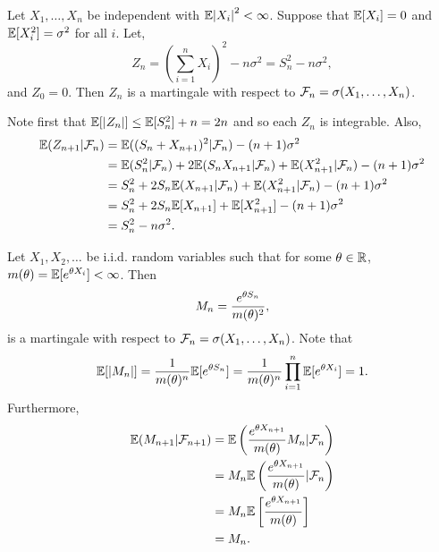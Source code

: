 \begin{example}
    Let $X_1,\ldots, X_n$ be independent with ${\mathbb{E}}{\left\lvert X_i\right\rvert}^2 < \infty$. Suppose that ${\mathbb{E}}[X_i]=0$ and ${\mathbb{E}}[X_i^2]=\sigma^2$ for all $i$. Let,
    \[Z_n = \left(\sum_{i=1}^n X_i\right)^2-n\sigma^2 = S_n^2-n\sigma^2,\]
    and $Z_0=0$. Then $Z_n$ is a martingale with respect to ${\mathcal{F}}_n = \sigma(X_1,\ldots, X_n)$.

    Note first that ${\mathbb{E}}[{\left\lvert Z_n\right\rvert}] \le {\mathbb{E}}[S_n^2]+n =2n$ and so each $Z_n$ is integrable. Also,
    \begin{align*}
        {\mathbb{E}}(Z_{n+1}|{\mathcal{F}}_n)&={\mathbb{E}}((S_n+X_{n+1})^2|{\mathcal{F}}_n) - (n+1)\sigma^2\\
        &={\mathbb{E}}(S_n^2|{\mathcal{F}}_n) + 2{\mathbb{E}}(S_nX_{n+1}|{\mathcal{F}}_n)+{\mathbb{E}}(X_{n+1}^2|{\mathcal{F}}_n)-(n+1)\sigma^2\\
        &=S_n^2+2S_n{\mathbb{E}}(X_{n+1}|{\mathcal{F}}_n)+{\mathbb{E}}(X_{n+1}^2|{\mathcal{F}}_n)-(n+1)\sigma^2\\
        &=S_n^2+2S_n{\mathbb{E}}[X_{n+1}]+{\mathbb{E}}[X_{n+1}^2]-(n+1)\sigma^2\\
        &=S_n^2-n\sigma^2.
    \end{align*}
\end{example}
\begin{example}
    Let $X_1,X_2,\ldots$ be i.i.d. random variables such that for some ${\theta} \in {\mathbb R}$, $m({\theta}) ={\mathbb{E}}[e^{{\theta} X_i}] < \infty$. Then 
    \[M_n = \frac{e^{{\theta} S_n}}{m({\theta})^2},\]
    is a martingale with respect to ${\mathcal{F}}_n = \sigma(X_1,\ldots,X_n)$. Note that 
    \[{\mathbb{E}}[{\left\lvert M_n\right\rvert}] = \frac{1}{m({\theta})^n}{\mathbb{E}}[e^{{\theta} S_n}]=\frac{1}{m({\theta})^n}\prod_{i=1}^n {\mathbb{E}}[e^{{\theta} X_i}]=1.\]
    Furthermore,
    \begin{align*}
        {\mathbb{E}}(M_{n+1}|{\mathcal{F}}_{n+1}) &={\mathbb{E}}\left(\frac{e^{{\theta} X_{n+1}}}{m({\theta})}M_n|{\mathcal{F}}_n\right)\\
        &=M_n{\mathbb{E}}\left(\frac{e^{{\theta} X_{n+1}}}{m({\theta})}|{\mathcal{F}}_n\right)\\
        &=M_n{\mathbb{E}}\left[\frac{e^{{\theta} X_{n+1}}}{m({\theta})}\right]\\
        &=M_n.
    \end{align*}
\end{example}
